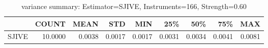 \begin{table}[ht]
\centering
\caption{variance summary: Estimator=SJIVE, Instruments=166, Strength=0.60}
\begin{tabular}{lrrrrrrrr}
\toprule
 & COUNT & MEAN & STD & MIN & 25\% & 50\% & 75\% & MAX \\
\midrule
SJIVE & 10.0000 & 0.0038 & 0.0017 & 0.0017 & 0.0031 & 0.0034 & 0.0041 & 0.0081 \\
\bottomrule
\end{tabular}
\end{table}
